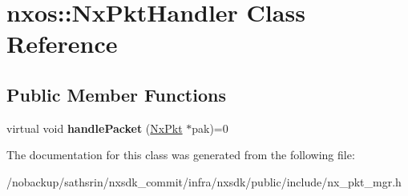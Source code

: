 \hypertarget{classnxos_1_1NxPktHandler}{\section{nxos\-:\-:Nx\-Pkt\-Handler Class Reference}
\label{classnxos_1_1NxPktHandler}
}
\subsection*{Public Member Functions}
\begin{DoxyCompactItemize}
\item 
\hypertarget{classnxos_1_1NxPktHandler_aa79ca28bafcf3d5107298367dd075419}{virtual void {\bfseries handle\-Packet} (\hyperlink{classnxos_1_1NxPkt}{Nx\-Pkt} $\ast$pak)=0}\label{classnxos_1_1NxPktHandler_aa79ca28bafcf3d5107298367dd075419}

\end{DoxyCompactItemize}


The documentation for this class was generated from the following file\-:\begin{DoxyCompactItemize}
\item 
/nobackup/sathsrin/nxsdk\-\_\-commit/infra/nxsdk/public/include/nx\-\_\-pkt\-\_\-mgr.\-h\end{DoxyCompactItemize}
